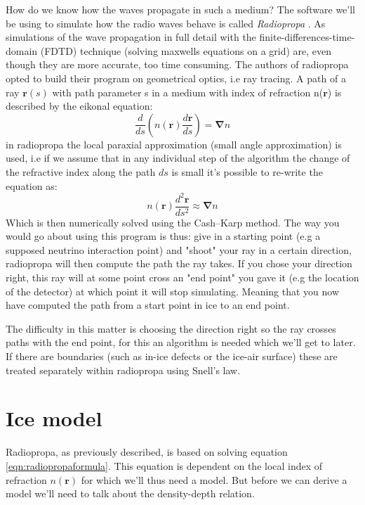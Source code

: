 How do we know how the waves propagate in such a medium?  The software we'll be
using to simulate how the radio waves behave is called \textit{Radiopropa}
\cite{Winchen_2019}. As simulations of the wave propagation in full detail with
the finite-differences-time-domain (FDTD) technique \cite{1138693} (solving
maxwells equations on a grid) are, even though they are more accurate, too time
consuming. The authors of radiopropa opted to build their program on
geometrical optics, i.e ray tracing. A path of a ray $\mathbf{r}(s)$ with path
parameter s in a medium with index of refraction n($\mathbf{r}$) is described
by the eikonal equation\cite{herman2019treatise}:
\begin{equation}
	\frac{d}{ds}\left(n(\mathbf{r})\frac{d\mathbf{r}}{ds}\right) = \mathbf{\nabla} n
\end{equation}
in radiopropa the local paraxial approximation (small angle approximation) is
used, i.e if we assume that in any individual step of the algorithm the change
of the refractive index along the path $ds$ is small it's possible to re-write
the equation as:
\begin{equation}
	n(\mathbf{r})\frac{d^2\mathbf{r}}{ds^2} \approx \mathbf{\nabla} n
	\label{eqn:radiopropaformula}
\end{equation}
Which is then numerically solved using the Cash–Karp method.  The way you would
go about using this program is thus: give in a starting point (e.g a supposed
neutrino interaction point) and "shoot" your ray in a
certain direction, radiopropa will then compute the path the ray takes. 
If you chose your direction right, this ray will at some point cross an
"end point" you gave it (e.g the location of the detector) at which point it will
stop simulating. Meaning that you now have computed the path from a start point in ice
to an end point.

The difficulty in this matter is choosing the direction right so the ray
crosses paths with the end point, for this an algorithm is needed which we'll
get to later.  If there are boundaries (such as in-ice defects or the ice-air surface) these
are treated separately within radiopropa using Snell's law. 
\section{Ice model}
\label{section:Ice Model}
Radiopropa, as previously described, is based on solving equation \ref{eqn:radiopropaformula}.
This equation is dependent on the local index of refraction $n(\mathbf{r})$ for which
we'll thus need a model. But before we can derive a model we'll need to talk about the
density-depth relation.

